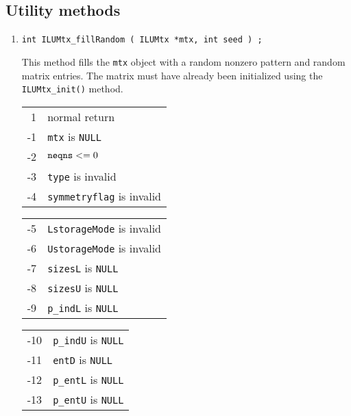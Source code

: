 \subsection{Utility methods}
\label{subsection:ILUMtx:proto:utility}
\par
\begin{enumerate}
\item
\begin{verbatim}
int ILUMtx_fillRandom ( ILUMtx *mtx, int seed ) ;
\end{verbatim}
This method fills the {\tt mtx} object with a random nonzero
pattern and random matrix entries.
The matrix must have already been initialized using the 
{\tt ILUMtx\_init()} method.
\par {}
\begin{center}
\begin{tabular}{rl}
 1 & normal return \\
-1 & {\tt mtx} is {\tt NULL} \\
-2 & ${\tt neqns} <= 0$ \\
-3 & {\tt type} is invalid \\
-4 & {\tt symmetryflag} is invalid \\
\end{tabular}
\quad
\begin{tabular}{rl}
-5 & {\tt LstorageMode} is invalid \\
-6 & {\tt UstorageMode} is invalid \\
-7 & {\tt sizesL} is {\tt NULL} \\
-8 & {\tt sizesU} is {\tt NULL} \\
-9 & {\tt p\_indL} is {\tt NULL} \\
\end{tabular}
\quad
\begin{tabular}{rl}
-10 & {\tt p\_indU} is {\tt NULL} \\
-11 & {\tt entD} is {\tt NULL} \\
-12 & {\tt p\_entL} is {\tt NULL} \\
-13 & {\tt p\_entU} is {\tt NULL} \\
\end{tabular}
\end{center}
\end{enumerate}
\par
